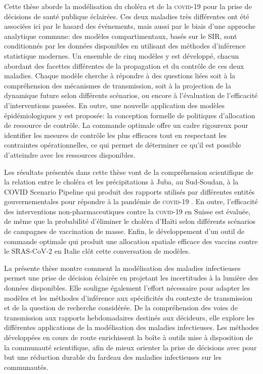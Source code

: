 Cette thèse aborde la modélisation du choléra et de la \textsc{covid}-19 pour la prise de décisions de santé publique éclairées. Ces deux maladies très différentes ont été associées ici par le hasard des événements, mais aussi par le biais d'une approche analytique commune: des modèles compartimentaux, basés sur le SIR, sont conditionnés par les données disponibles en utilisant des méthodes d'inférence statistique modernes. Un ensemble de cinq modèles y est développé, chacun abordant des facettes différentes de la propagation et du contrôle de ces deux maladies. Chaque modèle cherche à répondre à des questions liées soit à la compréhension des mécanismes de transmission, soit à la projection de la dynamique future selon différents scénarios, ou encore à l'évaluation de l'efficacité d'interventions passées. En outre, une nouvelle application des modèles épidémiologiques y est proposée: la conception formelle de politiques d'allocation de ressource de contrôle. La commande optimale offre un cadre rigoureux pour identifier les mesures de contrôle les plus efficaces tout en respectant les contraintes opérationnelles, ce qui permet de déterminer ce qu'il est possible d'atteindre avec les ressources disponibles.

Les résultats présentés dans cette thèse vont de la compréhension scientifique de la relation entre le choléra et les précipitations à Juba, au Sud-Soudan, à la COVID Scenario Pipeline qui produit des rapports utilisés par différentes entités gouvernementales pour répondre à la pandémie de \textsc{covid}-19 . En outre, l'efficacité des interventions non-pharmaceutiques contre la \textsc{covid}-19 en Suisse est évaluée, de même que la probabilité d'éliminer le choléra d'Haïti selon différents scénarios de campagnes de vaccination de masse. Enfin, le développement d'un outil de commande optimale qui produit une allocation spatiale efficace des vaccins contre le SRAS-CoV-2 en Italie clôt cette conversation de modèles.

La présente thèse montre comment la modélisation des maladies infectieuses permet une prise de décision éclairée en projetant les incertitudes à la lumière des données disponibles. Elle souligne également l'effort nécessaire pour adapter les modèles et les méthodes d'inférence aux spécificités du contexte de transmission et de la question de recherche considérée. De la compréhension des voies de transmission aux rapports hebdomadaires destinés aux décideurs, elle explore les différentes applications de la modélisation des maladies infectieuses. Les méthodes développées en cours de route enrichissent la boîte à outils mise à disposition de la communauté scientifique, afin de mieux orienter la prise de décisions avec pour but une réduction durable du fardeau des maladies infectieuses sur les communautés.


